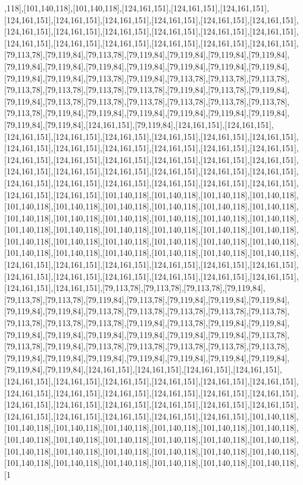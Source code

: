 ,118],[101,140,118],[101,140,118],[124,161,151],[124,161,151],[124,161,151],[124,161,151],[124,161,151],[124,161,151],[124,161,151],[124,161,151],[124,161,151],[124,161,151],[124,161,151],[124,161,151],[124,161,151],[124,161,151],[124,161,151],[124,161,151],[124,161,151],[124,161,151],[124,161,151],[124,161,151],[124,161,151],[79,113,78],[79,119,84],[79,113,78],[79,119,84],[79,119,84],[79,119,84],[79,119,84],[79,119,84],[79,119,84],[79,119,84],[79,119,84],[79,119,84],[79,119,84],[79,119,84],[79,119,84],[79,119,84],[79,113,78],[79,119,84],[79,113,78],[79,113,78],[79,113,78],[79,113,78],[79,113,78],[79,113,78],[79,113,78],[79,119,84],[79,113,78],[79,119,84],[79,119,84],[79,113,78],[79,113,78],[79,113,78],[79,113,78],[79,113,78],[79,113,78],[79,113,78],[79,119,84],[79,119,84],[79,119,84],[79,119,84],[79,119,84],[79,119,84],[79,119,84],[79,119,84],[124,161,151],[79,119,84],[124,161,151],[124,161,151],[124,161,151],[124,161,151],[124,161,151],[124,161,151],[124,161,151],[124,161,151],[124,161,151],[124,161,151],[124,161,151],[124,161,151],[124,161,151],[124,161,151],[124,161,151],[124,161,151],[124,161,151],[124,161,151],[124,161,151],[124,161,151],[124,161,151],[124,161,151],[124,161,151],[124,161,151],[124,161,151],[124,161,151],[124,161,151],[124,161,151],[124,161,151],[124,161,151],[124,161,151],[124,161,151],[124,161,151],[124,161,151],[101,140,118],[101,140,118],[101,140,118],[101,140,118],[101,140,118],[101,140,118],[101,140,118],[101,140,118],[101,140,118],[101,140,118],[101,140,118],[101,140,118],[101,140,118],[101,140,118],[101,140,118],[101,140,118],[101,140,118],[101,140,118],[101,140,118],[101,140,118],[101,140,118],[101,140,118],[101,140,118],[101,140,118],[101,140,118],[101,140,118],[101,140,118],[101,140,118],[101,140,118],[101,140,118],[101,140,118],[101,140,118],[101,140,118],[101,140,118],[124,161,151],[124,161,151],[124,161,151],[124,161,151],[124,161,151],[124,161,151],[124,161,151],[124,161,151],[124,161,151],[124,161,151],[124,161,151],[124,161,151],[124,161,151],[124,161,151],[79,113,78],[79,113,78],[79,113,78],[79,119,84],[79,113,78],[79,113,78],[79,119,84],[79,113,78],[79,119,84],[79,119,84],[79,119,84],[79,119,84],[79,119,84],[79,113,78],[79,113,78],[79,113,78],[79,113,78],[79,113,78],[79,113,78],[79,113,78],[79,113,78],[79,119,84],[79,113,78],[79,119,84],[79,119,84],[79,119,84],[79,119,84],[79,119,84],[79,119,84],[79,119,84],[79,119,84],[79,113,78],[79,113,78],[79,119,84],[79,113,78],[79,113,78],[79,113,78],[79,113,78],[79,113,78],[79,119,84],[79,119,84],[79,119,84],[79,119,84],[79,119,84],[79,119,84],[79,119,84],[79,119,84],[79,119,84],[124,161,151],[124,161,151],[124,161,151],[124,161,151],[124,161,151],[124,161,151],[124,161,151],[124,161,151],[124,161,151],[124,161,151],[124,161,151],[124,161,151],[124,161,151],[124,161,151],[124,161,151],[124,161,151],[124,161,151],[124,161,151],[124,161,151],[124,161,151],[124,161,151],[124,161,151],[124,161,151],[124,161,151],[124,161,151],[124,161,151],[124,161,151],[101,140,118],[101,140,118],[101,140,118],[101,140,118],[101,140,118],[101,140,118],[101,140,118],[101,140,118],[101,140,118],[101,140,118],[101,140,118],[101,140,118],[101,140,118],[101,140,118],[101,140,118],[101,140,118],[101,140,118],[101,140,118],[101,140,118],[101,140,118],[101,140,118],[101,140,118],[101,140,118],[101,140,118],[101,140,118],[1
